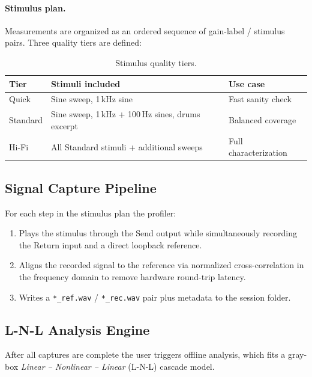 \documentclass[11pt, letterpaper]{article}
\begin{document}
\paragraph{Stimulus plan.}
Measurements are organized as an ordered sequence of gain-label / stimulus
pairs.  Three quality tiers are defined:

\begin{table}[H]
\centering
\begin{tabular}{lll}
\toprule
\textbf{Tier} & \textbf{Stimuli included} & \textbf{Use case} \\
\midrule
Quick    & Sine sweep, 1\,kHz sine                             & Fast sanity check \\
Standard & Sine sweep, 1\,kHz + 100\,Hz sines, drums excerpt  & Balanced coverage \\
Hi-Fi    & All Standard stimuli + additional sweeps            & Full characterization \\
\bottomrule
\end{tabular}
\caption{Stimulus quality tiers.}
\end{table}

\subsection{Signal Capture Pipeline}

For each step in the stimulus plan the profiler:
\begin{enumerate}[leftmargin=1.5em]
    \item Plays the stimulus through the Send output while simultaneously
          recording the Return input and a direct loopback reference.
    \item Aligns the recorded signal to the reference via normalized
          cross-correlation in the frequency domain to remove hardware
          round-trip latency.
    \item Writes a \texttt{*\_ref.wav} / \texttt{*\_rec.wav} pair plus
          metadata to the session folder.
\end{enumerate}

\subsection{L-N-L Analysis Engine}

After all captures are complete the user triggers offline analysis, which fits
a gray-box \emph{Linear -- Nonlinear -- Linear} (L-N-L) cascade model.
\end{document}
